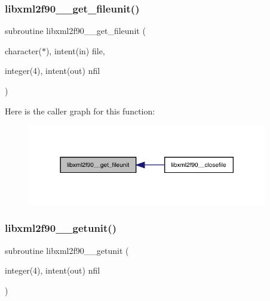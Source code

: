 \subsubsection{\texorpdfstring{libxml2f90\+\_\+\+\_\+get\+\_\+fileunit()}{libxml2f90\_\_get\_fileunit()}}
{\footnotesize\ttfamily subroutine libxml2f90\+\_\+\+\_\+get\+\_\+fileunit (\begin{DoxyParamCaption}\item[{character($\ast$), intent(in)}]{file,  }\item[{integer(4), intent(out)}]{nfil }\end{DoxyParamCaption})}

Here is the caller graph for this function\+:
\nopagebreak
\begin{figure}[H]
\begin{center}
\leavevmode
\includegraphics[width=297pt]{libxml2f90_8f90__pp_8f90_a43747477c64dd030f8e9dd0cc3ee36ad_icgraph}
\end{center}
\end{figure}
\mbox{\label{libxml2f90_8f90__pp_8f90_a91985cd2da8e09ba96809c73c6fa0286}} 
\subsubsection{\texorpdfstring{libxml2f90\+\_\+\+\_\+getunit()}{libxml2f90\_\_getunit()}}
{\footnotesize\ttfamily subroutine libxml2f90\+\_\+\+\_\+getunit (\begin{DoxyParamCaption}\item[{integer(4), intent(out)}]{nfil }\end{DoxyParamCaption})}

